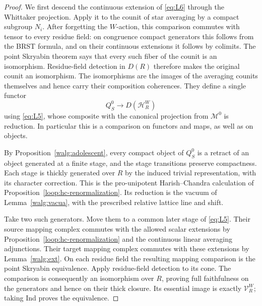 \documentclass[11pt]{article}
\numberwithin{equation}{section}
\theoremstyle{definition}
\theoremstyle{remark}
\begin{document}
\begin{proof}
We first descend the continuous extension of \eqref{eq:L6} through
the Whittaker projection.  Apply it to the counit of star averaging
by a compact subgroup \(N_i\).  After forgetting the \(W\)-action,
this comparison commutes with tensor to every residue field:
on congruence compact generators this follows from the BRST formula,
and on their continuous extensions it follows by colimits.  The
point Skryabin theorem says that every such fiber of the counit is
an isomorphism.  Residue-field detection in \(D(R)\) therefore makes
the original counit an isomorphism.  The isomorphisms are the images
of the averaging counits themselves and hence carry their composition
coherences.  They define a single functor
\[
 Q_S^0\longrightarrow D(\mathcal H_R^W)
\]
using \eqref{eq:L5}, whose composite with the canonical projection
from \(\mathcal M^0\) is reduction.  In particular this is a
comparison on functors and maps, as well as on objects.

By Proposition~\ref{walg:adolescent}, every compact object of
\(Q_S^0\) is a retract of an object generated at a finite stage,
and the stage transitions preserve compactness.  Each stage is
thickly generated over \(R\) by the induced trivial representation,
with its character correction.  This is the pro-unipotent
Harish--Chandra calculation of
Proposition~\ref{loop:hc-renormalization}.  Its reduction is the
vacuum of Lemma~\ref{walg:vacua}, with the prescribed relative lattice
line and shift.

Take two such generators.  Move them to a common later stage of
\eqref{eq:L5}.  Their source mapping complex commutes with the allowed
scalar extensions by Proposition~\ref{loop:hc-renormalization}
and the continuous linear averaging adjunctions.  Their target
mapping complex commutes with these extensions by
Lemma~\ref{walg:ext}.  On each residue field the resulting mapping
comparison is the point Skryabin equivalence.  Apply residue-field
detection to its cone.  The comparison is consequently an
isomorphism over \(R\), proving full faithfulness on the generators
and hence on their thick closure.  Its essential image is exactly
\(\mathcal V_R^W\); taking Ind proves the equivalence.


\end{proof}
\end{document}
